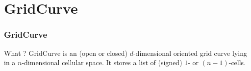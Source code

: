 \section{GridCurve}

\begin{frame}
  \frametitle{GridCurve}

  \begin{block}{What ?}
GridCurve is an (open or closed) $d$-dimensional oriented grid curve 
lying in a $n$-dimensional cellular space. 
It stores a list of (signed) $1$- or $(n-1)$-cells. 
  \end{block}

 \begin{figure}
   \centering
 \end{figure}
\end{frame}

